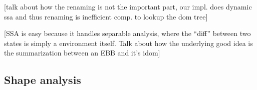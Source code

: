 \documentclass[14pt]{article}
\begin{document}
[talk about how the renaming is not the important part, our impl. does dynamic ssa and thus renaming is inefficient comp. to lookup the dom tree]

[SSA is easy because it handles separable analysis, where the ``diff'' between two states is simply a environment itself. Talk about how the underlying good idea is the summarization between an EBB and it's idom]

\subsection*{Shape analysis}
\end{document}

